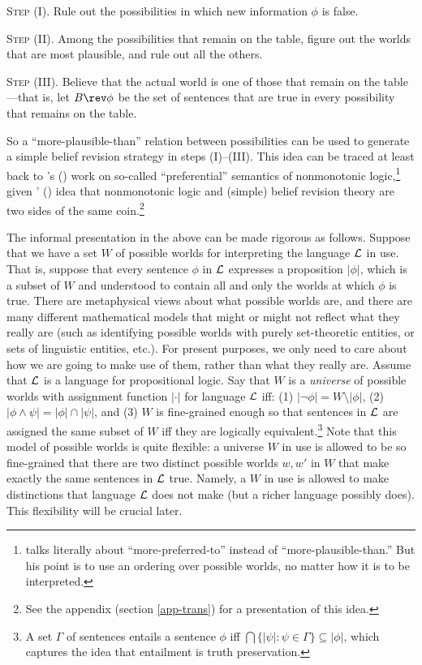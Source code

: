 	\xm \textsc{Step (I).} Rule out the possibilities in which new information $\phi$ is false.
	
	\xm \textsc{Step (II).} Among the possibilities that remain on the table, figure out the worlds that are most plausible, and rule out all the others.
	
	\xm \textsc{Step (III).} Believe that the actual world is one of those that remain on the table---that is, let $B \rev \phi$ be the set of sentences that are true in every possibility that remains on the table. 

\ed So a ``more-plausible-than'' relation between possibilities can be used to generate a simple belief revision strategy in steps (I)--(III). This idea can be traced at least back to \citeauthor{shoham1987semantical}'s () work on so-called ``preferential'' semantics of nonmonotonic logic,\footnote
	{\citet{shoham1987semantical} talks literally about ``more-preferred-to'' instead of ``more-plausible-than.'' But his point is to use an ordering over possible worlds, no matter how it is to be interpreted.} 
given \citeauthor{makinson1991relations}' () idea that nonmonotonic logic and (simple) belief revision theory are two sides of the same coin.\footnote
{See the appendix (section \ref{app-trans}) for a presentation of this idea.}

The informal presentation in the above can be made rigorous as follows. Suppose that we have a set $W$ of possible worlds for interpreting the language $\cal L$ in use. That is, suppose that every sentence $\phi$ in ${\cal L}$ expresses a proposition $|\phi|$, which is a subset of $W$ and understood to contain all and only the worlds at which $\phi$ is true.  There are metaphysical views about what possible worlds are, and there are many different mathematical models that might or might not reflect what they really are (such as identifying possible worlds with purely set-theoretic entities, or sets of linguistic entities, etc.). For present purposes, we only need to care about how we are going to make use of them, rather than what they really are. Assume that ${\cal L}$ is a language for propositional logic. Say that $W$ is a {\em universe} of possible worlds with assignment function $|\cdot|$ for language ${\cal L}$ iff: (1) $|\neg\phi| = W \setminus |\phi|$, (2) $|\phi\wedge\psi| = |\phi|\cap|\psi|$, and (3) $W$ is fine-grained enough so that sentences in $\cal L$ are assigned the same subset of $W$ iff they are logically equivalent.\footnote
	{A set $\Gamma$ of sentences entails a sentence $\phi$ iff $\bigcap \{ |\psi|: \psi \in \Gamma\} \subseteq |\phi|$, which captures the idea that entailment is truth preservation.} 
Note that this model of possible worlds is quite flexible: a universe $W$ in use is allowed to be so fine-grained that there are two distinct possible worlds $w, w'$ in $W$ that make exactly the same sentences in $\cal L$ true. Namely, a $W$ in use is allowed to make distinctions that language $\cal L$ does not make (but a richer language possibly does). This flexibility will be crucial later. 


